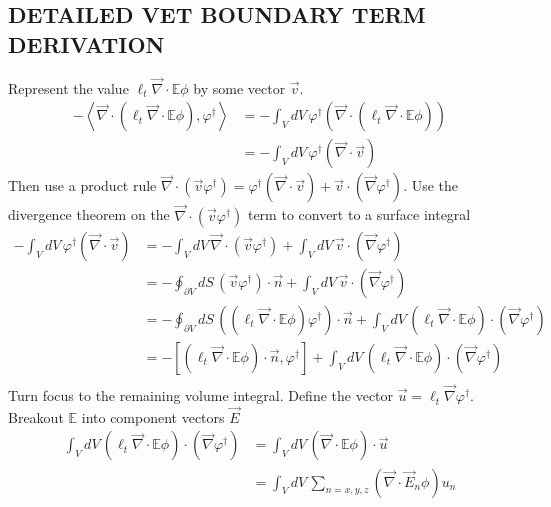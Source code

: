 \documentclass[12pt]{report}
\newcommand{\bra}{\left\langle}
\newcommand{\ket}{\right\rangle}
\newcommand{\sbra}{\left[}
\newcommand{\sket}{\right]}
\renewcommand{\div}{\vec{\nabla} \cdot}
\newcommand{\grad}{\vec{\nabla}}
\newcommand{\vefadj}{\varphi^\dag}
\newcommand{\bound}{\partial V}
\newcommand{\vn}{\vec{n}}
\newcommand{\Edd}{\mathbb{E}}
\newcommand{\isigt}{\ell_t}
\begin{document}
\begin{appendices}
\chapter{\uppercase{Detailed VET Boundary Term Derivation}} \label{chap:appx2}
Represent the value $\isigt \div \Edd \phi$ by some vector $\vec{v}$. 
\begin{equation}
\begin{split}
- \bra \div \left( \isigt \div \Edd \phi \right), \vefadj \ket
&= - \int_V dV \, \vefadj  \left( \div \left( \isigt \div \Edd \phi \right) \right) \\
&= - \int_V dV \, \vefadj  \left( \div \vec{v}\right)
\end{split}
\end{equation}
Then use a product rule $\div (\vec{v} \varphi^\dag) = \varphi^\dag (\div \vec{v}) + \vec{v} \cdot (\grad \varphi^\dag)  $. Use the divergence theorem on the $\div (\vec{v} \varphi^\dag)$ term to convert to a surface integral
\begin{equation}
\begin{split}
- \int_V dV \, \vefadj  \left( \div \vec{v}\right) &= - \int_V dV \, \div (\vec{v} \varphi^\dag) + \int_V dV \, \vec{v} \cdot (\grad \varphi^\dag) \\
&= - \oint_{\bound} dS \, (\vec{v} \varphi^\dag) \cdot \vn + \int_V dV \, \vec{v} \cdot (\grad \varphi^\dag) \\
&= - \oint_{\bound} dS \, \left( \left( \isigt \div \Edd \phi \right) \varphi^\dag \right) \cdot \vn + \int_V dV \, \left( \isigt \div \Edd \phi \right) \cdot (\grad \varphi^\dag) \\
&= - \sbra \left(  \isigt \div \Edd \phi \right)  \cdot \vn , \varphi^\dag\sket + \int_V dV \, \left( \isigt \div \Edd \phi \right) \cdot (\grad \varphi^\dag) \\
\end{split}
\end{equation}
Turn focus to the remaining volume integral. Define the vector $\vec{u} = \isigt \grad \varphi^\dag$. Breakout $\Edd$ into component vectors $\vec{E}$ 
\begin{equation}
\begin{split}
\int_V dV \, \left( \isigt \div \Edd \phi \right) \cdot (\grad \varphi^\dag) 
& = \int_V dV \, \left( \div \Edd \phi \right) \cdot \vec{u} \\
& = \int_V dV \, \sum_{n=x,y,z} \left( \div \vec{E}_n \phi \right) u_{n} \\

\end{split}
\end{equation}
\end{appendices}
\end{document}
